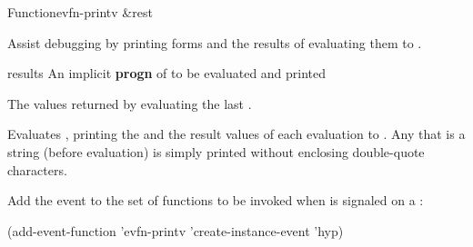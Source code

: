 \documentclass[10pt,twoside,english,pdftex]{article}
\begin{document}

\begin{functiondoc}{Function}{evfn-printv}{ 
    \&rest }
% 

\fnsyntax

\fnpurpose Assist debugging by printing forms and the results of
evaluating them to .

\fnpackage {}

\fnmodule {}

\fnargs
\begin{args}{results}
\arg[forms] An implicit \textbf{progn} of  to be
evaluated and printed  
\end{args}

\fnreturns The values returned by evaluating the last .

\fndescription Evaluates , printing the  and the
result values of each evaluation to .  Any
that is a string (before evaluation) is simply printed without enclosing
double-quote characters.

\fnexamples
{}%
Add the event   to the set of functions
to be invoked when  is signaled on a
 :
%
\W\supp
\begin{example}
  (add-event-function 'evfn-printv 'create-instance-event 'hyp)
\end{example}

\end{functiondoc}

\end{document}

